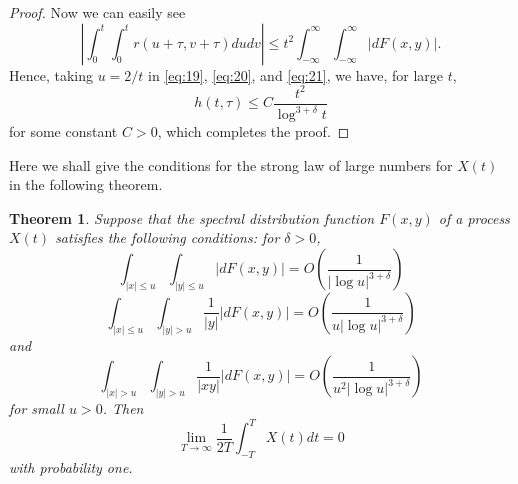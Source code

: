 \documentclass{article}
\newtheorem{theorem}{Theorem}
\begin{document}
\begin{proof}
Now we can easily see
\begin{equation}\label{eq:43}
\left|\int_{0}^{t} \int_{0}^{t} r(u+\tau, v+\tau) dudv\right| \leq t^{2} \int_{-\infty}^{\infty} \int_{-\infty}^{\infty}|dF(x,y)|.
\end{equation}
Hence, taking $u=2/t$ in \eqref{eq:19}, \eqref{eq:20}, and \eqref{eq:21}, we have, for large $t$,
\begin{equation}\label{eq:44}
h(t, \tau) \leq C \frac{t^{2}}{\log^{3+\delta} t}
\end{equation}
for some constant $C>0$, which completes the proof.
\end{proof}

Here we shall give the conditions for the strong law of large numbers for $X(t)$ in the following theorem.

\begin{theorem}\label{thm:1}
Suppose that the spectral distribution function $F(x,y)$ of a process $X(t)$ satisfies the following conditions: for $\delta>0$,
\begin{equation}\label{eq:45}
\int_{|x| \leq u} \int_{|y| \leq u}|dF(x,y)|=O\left(\frac{1}{|\log u|^{3+\delta}}\right)
\end{equation}
\begin{equation}\label{eq:46}
\int_{|x| \leq u} \int_{|y|>u} \frac{1}{|y|}|dF(x,y)|=O\left(\frac{1}{u|\log u|^{3+\delta}}\right)
\end{equation}
and
\begin{equation}\label{eq:47}
\int_{|x|>u} \int_{|y|>u} \frac{1}{|xy|}|dF(x,y)|=O\left(\frac{1}{u^{2}|\log u|^{3+\delta}}\right)
\end{equation}
for small $u>0$. Then
\begin{equation}\label{eq:48}
\lim_{T \rightarrow \infty} \frac{1}{2T} \int_{-T}^{T} X(t) dt=0
\end{equation}
with probability one.
\end{theorem}
\end{document}
